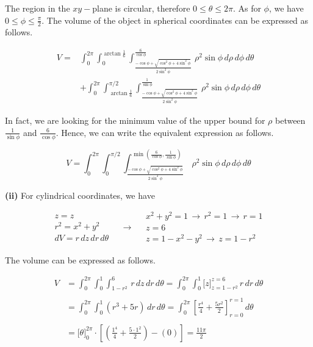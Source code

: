 \documentclass{article}
\begin{document}
The region in the $xy-$plane is circular, therefore $0\leq\theta\leq2\pi$. As for $\phi$, we have $\displaystyle0\leq\phi\leq\frac{\pi}2$. The volume of the object in spherical coordinates can be expressed as follows.

\[
\boxed{\begin{array}{cc}
V=&\displaystyle\int_0^{2\pi}\int_0^{\arctan{\textstyle\frac16}}\int_{\textstyle\frac{-\cos\phi +\sqrt{\cos^2\phi+4\sin^2\phi}}{2\sin^2\phi}}^{\textstyle\frac6{\cos\phi}}\,\rho^2\sin\phi\,d\rho\,d\phi\,d\theta\\
&\displaystyle+\int_0^{2\pi}\int_{\arctan{\textstyle\frac16}}^{\pi/2}\int_{\textstyle\frac{-\cos\phi +\sqrt{\cos^2\phi+4\sin^2\phi}}{2\sin^2\phi}}^{\textstyle\frac1{\sin\phi}}\,\rho^2\sin\phi\,d\rho\,d\phi\,d\theta 
\end{array}}
\]

In fact, we are looking for the minimum value of the upper bound for $\rho$ between $\displaystyle\frac1{\sin\phi}$ and $\displaystyle\frac6{\cos\phi}$. Hence, we can write the equivalent expression as follows.

\[
\boxed{V=\displaystyle\int_0^{2\pi}\int_0^{\pi/2}\int_{\textstyle\frac{-\cos\phi +\sqrt{\cos^2\phi+4\sin^2\phi}}{2\sin^2\phi}}^{\min\left(\textstyle\frac6{\cos\phi},\frac1{\sin\phi}\right)}\,\rho^2\sin\phi\,d\rho\,d\phi\,d\theta}
\]

\textbf{(ii)} For cylindrical coordinates, we have

\[
\begin{array}{c}
z=z\\
r^2=x^2+y^2\\
dV=r\,dz\,dr\,d\theta
\end{array}\quad\rightarrow\quad
\begin{array}{c}
x^2+y^2=1\,\rightarrow\,r^2 = 1\,\rightarrow\,r=1\\
z=6\\
z=1-x^2-y^2\,\rightarrow\,z=1-r^2
\end{array}
\]

The volume can be expressed as follows.

\begin{align*}
    V&=\int_0^{2\pi}\int_0^1\int_{1-r^2}^{6}\,r\,dz\,dr\,d\theta=\int_0^{2\pi}\int_0^1\big[z\big]_{z=1-r^2}^{z=6}\,r\,dr\,d\theta\\\\&=\int_0^{2\pi}\int_0^1\left(r^3+5r\right)\,dr\,d\theta=\int_0^{2\pi}\left[\frac{r^4}{4} + \frac{5r^2}{2}\right]_{r=0}^{r=1}\,d\theta\\\\&=\big[\theta\big]_0^{2\pi}\cdot\left[ \left(\frac{1^4}4 + \frac{5\cdot1^2}2\right)-\left(0\right)\right]=\boxed{\frac{11\pi}2}
\end{align*}
\end{document}
